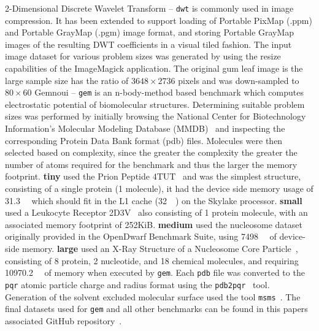 \documentclass[../document.tex]{subfiles}
\begin{document}
2-Dimensional Discrete Wavelet Transform -- {\tt dwt} is commonly used in image compression.
It has been extended to support loading of Portable PixMap (.ppm) and Portable GrayMap (.pgm) image format, and storing Portable GrayMap images of the resulting DWT coefficients in a visual tiled fashion.
The input image dataset for various problem sizes was generated by using the resize capabilities of the ImageMagick application.
The original gum leaf image is the large sample size has the ratio of $3648 \times 2736$ pixels and was down-sampled to  $80 \times 60$ 
Gemnoui -- {\tt gem} is an n-body-method based benchmark which computes electrostatic potential of biomolecular structures.
Determining suitable problem sizes was performed by initially browsing the National Center for Biotechnology Information's Molecular Modeling Database (MMDB)~\cite{madej2013mmdb} and inspecting the corresponding Protein Data Bank format (pdb) files.
Molecules were then selected based on complexity, since the greater the complexity the greater the number of atoms required for the benchmark and thus the larger the memory footprint.
{\bf tiny} used the Prion Peptide 4TUT~\cite{yu2015crystal} and was the simplest structure, consisting of a single protein (1 molecule), it had the device side memory usage of \SI{31.3}{\kibi\byte} which should fit in the L1 cache (\SI{32}{\kibi\byte}) on the Skylake processor.
{\bf small} used a Leukocyte Receptor 2D3V~\cite{shiroishi2006crystal} also consisting of 1 protein molecule, with an associated memory footprint of 252KiB.
{\bf medium} used the nucleosome dataset originally provided in the OpenDwarf Benchmark Suite, using \SI{7498}{\kibi\byte} of device-side memory.
{\bf large} used an X-Ray Structure of a Nucleosome Core Particle~\cite{davey2002solvent}, consisting of 8 protein, 2 nucleotide, and 18 chemical molecules, and requiring \SI{10970.2}{\kibi\byte} of memory when executed by {\tt gem}.
Each {\tt pdb} file was converted to the {\tt pqr} atomic particle charge and radius format using the {\tt pdb2pqr}~\cite{dolinsky2004pdb2pqr} tool.
Generation of the solvent excluded molecular surface used the tool {\tt msms}~\cite{sanner1996reduced}.
The final datasets used for {\tt gem} and all other benchmarks can be found in this papers associated GitHub repository~\cite{johnston2017}.

\end{document}
